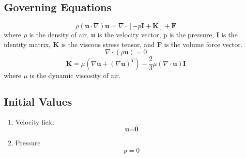 \documentclass{report}
\begin{document}
        \subsection{Governing Equations}
            \begin{equation}
                \rho (\textbf{u} \cdot \nabla) \textbf{u} = \nabla \cdot \left[-p\textbf{I} + \textbf{K} \right] + \textbf{F} 
            \end{equation}
                \noindent where \(\rho\) is the density of air, \textbf{u} is the velocity vector, p is the pressure, \textbf{I} is the identity matrix, \textbf{K} is the viscous stress tensor, and \textbf{F} is the volume force vector.
            \begin{equation}
                \nabla \cdot (\rho \textbf{u})= 0 %
            \end{equation}
            \begin{equation}
                \textbf{K} = \mu (\nabla \textbf{u} + (\nabla \textbf{u})^T) - \frac{2}{3} \mu (\nabla \cdot \textbf{u})\textbf{I} %
            \end{equation}
                where \textbf{\(\mu\)} is the dynamic viscosity of air. 
    
        \subsection{Initial Values}
            \begin{enumerate}
                \item Velocity field
                    \begin{equation}
                        \textbf{u} = \textbf{0}
                    \end{equation}
                \item Pressure
                    \begin{equation}
                        p = 0
                    \end{equation}
            \end{enumerate}
\end{document}
